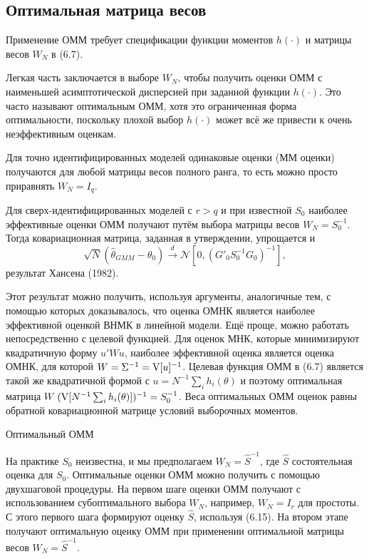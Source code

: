 \subsection{Оптимальная матрица весов}

Применение ОММ требует спецификации функции моментов $h(\cdot)$ и матрицы весов $W_N$ в (6.7).

Легкая часть заключается в выборе $W_N$, чтобы получить оценки ОММ с наименьшей асимптотической дисперсией при заданной функции $h(\cdot)$. Это часто называют оптимальным ОММ, хотя это ограниченная форма оптимальности, поскольку плохой выбор $h(\cdot)$ может всё же привести к очень неэффективным оценкам.

Для точно идентифицированных моделей одинаковые оценки (ММ оценки) получаются для любой матрицы весов полного ранга, то есть можно просто приравнять $W_N=I_q$.

Для сверх-идентифицированных моделей с $r>q$ и при известной $S_0$ наиболее эффективные оценки  ОММ получают путём выбора матрицы весов $W_N=S^{-1}_0$. Тогда ковариационная матрица, заданная в утверждении, упрощается и
\begin{equation}
\sqrt{N} (\hat{\theta}_{GMM}-\theta_0) \xrightarrow{d} \mathcal{N}[0,(G'_0 S^{-1}_0 G_0)^{-1}], 
\end{equation}
результат Хансена (1982).

Этот результат можно получить, используя аргументы, аналогичные тем, с помощью которых доказывалось, что оценка ОМНК является наиболее эффективной оценкой ВНМК в линейной модели. Ещё проще, можно работать непосредственно с целевой функцией. Для оценок МНК, которые минимизируют квадратичную форму $u'Wu$, наиболее эффективной оценка является оценка ОМНК, для которой $W=\Sigma^{-1}=\mathrm{V}[u]^{-1}$. Целевая функция ОММ в (6.7) является такой же квадратичной формой с $u=N^{-1} \sum_i h_i(\theta)$ и поэтому оптимальная матрица $W$ $(\mathrm{V}[N^{-1} \sum_i h_i(\theta)])^{-1}=S^{-1}_0$. Веса оптимальных ОММ оценок равны обратной ковариационной матрице условий выборочных моментов.

\begin{center}
Оптимальный ОММ
\end{center}

На практике $S_0$ неизвестна, и мы предполагаем $W_N={\hat{S}}^{-1}$, где $\hat{S}$ состоятельная оценка для $S_0$. Оптимальные оценки ОММ можно получить с помощью двухшаговой процедуры. На первом шаге оценки ОММ получают с использованием субоптимального выбора $W_N$, например, $W_N=I_r$ для простоты. С этого первого шага формируют оценку $\hat{S}$, используя (6.15). На втором этапе получают оптимальную оценку ОММ при применении оптимальной матрицы весов $W_N={\hat{S}}^{-1}$.

